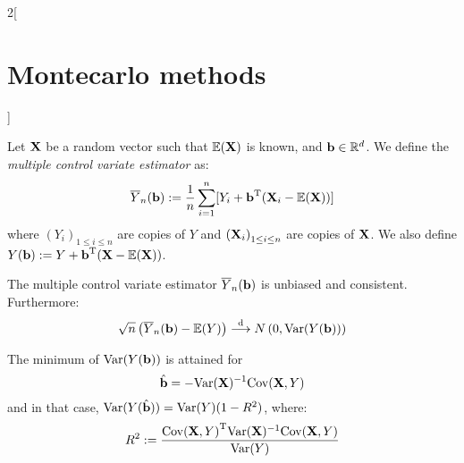 \documentclass[../../../main_math.tex]{subfiles}
\begin{document}
\begin{multicols}{2}[\section{Montecarlo methods}]
\begin{definition}
    Let $\boldsymbol{\mathrm{X}}$ be a random vector such that $\mathbb{E}(\boldsymbol{\mathrm{X}})$ is known, and $\boldsymbol{\mathrm{b}}\in \mathbb{R}^d$. We define the \emph{multiple control variate estimator} as:
    $$
      \overline{Y}_n(\boldsymbol{\mathrm{b}}):=\frac{1}{n}\sum_{i=1}^n [Y_i+{\boldsymbol{\mathrm{b}}}^{\mathrm{T}}(\boldsymbol{\mathrm{X}}_i-\mathbb{E}(\boldsymbol{\mathrm{X}}))]
    $$
    where ${(Y_i)}_{1\leq i\leq n}$ are \iid copies of $Y$ and ${(\boldsymbol{\mathrm{X}}_i)}_{1\leq i\leq n}$ are \iid copies of $\boldsymbol{\mathrm{X}}$.
    We also define $Y(\boldsymbol{\mathrm{b}}):= Y+{\boldsymbol{\mathrm{b}}}^{\mathrm{T}}(\boldsymbol{\mathrm{X}}-\mathbb{E}(\boldsymbol{\mathrm{X}}))$.
  \end{definition}
  \begin{lemma}
    The multiple control variate estimator $\overline{Y}_n(\boldsymbol{\mathrm{b}})$ is unbiased and consistent. Furthermore:
    $$
      \sqrt{n}\left(\overline{Y}_n(\boldsymbol{\mathrm{b}})-\mathbb{E}(Y)\right)\overset{\text{d}}{\longrightarrow}N\left(0,\mathrm{Var}(Y(\boldsymbol{\mathrm{b}}))\right)
    $$
  \end{lemma}
  \begin{proposition}
    The minimum of $\mathrm{Var}(Y(\boldsymbol{\mathrm{b}}))$ is attained for $$\hat{\boldsymbol{\mathrm{b}}}=
      -\mathrm{Var}(\boldsymbol{\mathrm{X}})^{-1}\mathrm{Cov}(\boldsymbol{\mathrm{X}},Y)
    $$
    and in that case, $\mathrm{Var}(Y(\hat{\boldsymbol{\mathrm{b}}}))=\mathrm{Var}(Y)(1-R^2)$, where:
    $$
      R^2:=\frac{{\mathrm{Cov}(\boldsymbol{\mathrm{X}},Y)}^{\mathrm{T}}\mathrm{Var}(\boldsymbol{\mathrm{X}})^{-1}\mathrm{Cov}(\boldsymbol{\mathrm{X}},Y)}{\mathrm{Var}(Y)}
    $$
  \end{proposition}

\end{multicols}
\end{document}
